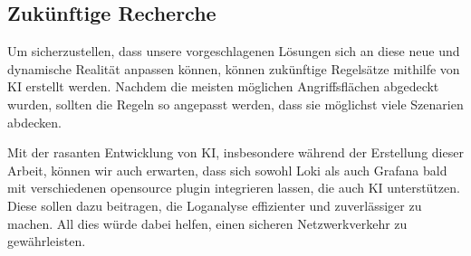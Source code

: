 \subsection{Zukünftige Recherche}
Um sicherzustellen, dass unsere vorgeschlagenen Lösungen sich an diese neue und dynamische Realität anpassen können, können zukünftige Regelsätze mithilfe von \gls{KI} erstellt werden. Nachdem die meisten möglichen Angriffsflächen abgedeckt wurden, sollten die Regeln so angepasst werden, dass sie möglichst viele Szenarien abdecken.


Mit der rasanten Entwicklung von \gls{KI}, insbesondere während der Erstellung dieser Arbeit, können wir auch erwarten, dass sich sowohl Loki als auch Grafana bald mit verschiedenen \gls{opensource} \gls{plugin} integrieren lassen, die auch \gls{KI} unterstützen. Diese sollen dazu beitragen, die Loganalyse effizienter und zuverlässiger zu machen. All dies würde dabei helfen, einen sicheren Netzwerkverkehr zu gewährleisten.


